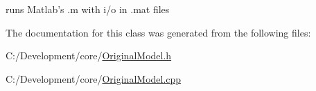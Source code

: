 runs Matlab's .m with i/o in .mat files 



The documentation for this class was generated from the following files\-:\begin{DoxyCompactItemize}
\item 
C\-:/\-Development/core/\hyperlink{_original_model_8h}{Original\-Model.\-h}\item 
C\-:/\-Development/core/\hyperlink{_original_model_8cpp}{Original\-Model.\-cpp}\end{DoxyCompactItemize}
